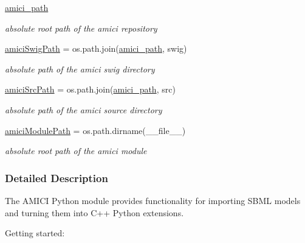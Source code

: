 \begin{DoxyCompactItemize}
\mbox{\hyperlink{namespaceamici_a6b3f3dfe4601baaa0bf0a02b9a01a896}{amici\+\_\+path}}
\begin{DoxyCompactList}\small\item\em absolute root path of the amici repository \end{DoxyCompactList}\item 
\mbox{\label{namespaceamici_a1e71ffa8e12718e578ac6b974c5a6cd5}} 
\mbox{\hyperlink{namespaceamici_a1e71ffa8e12718e578ac6b974c5a6cd5}{amici\+Swig\+Path}} = os.\+path.\+join(\mbox{\hyperlink{namespaceamici_a6b3f3dfe4601baaa0bf0a02b9a01a896}{amici\+\_\+path}}, \textquotesingle{}swig\textquotesingle{})
\begin{DoxyCompactList}\small\item\em absolute path of the amici swig directory \end{DoxyCompactList}\item 
\mbox{\label{namespaceamici_a2dfea9ae83d246c055e3ee84c9c5e9ac}} 
\mbox{\hyperlink{namespaceamici_a2dfea9ae83d246c055e3ee84c9c5e9ac}{amici\+Src\+Path}} = os.\+path.\+join(\mbox{\hyperlink{namespaceamici_a6b3f3dfe4601baaa0bf0a02b9a01a896}{amici\+\_\+path}}, \textquotesingle{}src\textquotesingle{})
\begin{DoxyCompactList}\small\item\em absolute path of the amici source directory \end{DoxyCompactList}\item 
\mbox{\label{namespaceamici_a54d4969414b0861bd938470a7c7bbd20}} 
\mbox{\hyperlink{namespaceamici_a54d4969414b0861bd938470a7c7bbd20}{amici\+Module\+Path}} = os.\+path.\+dirname(\+\_\+\+\_\+file\+\_\+\+\_\+)
\begin{DoxyCompactList}\small\item\em absolute root path of the amici module \end{DoxyCompactList}\end{DoxyCompactItemize}


\subsubsection{Detailed Description}
The A\+M\+I\+CI Python module provides functionality for importing S\+B\+ML models and turning them into C++ Python extensions.

Getting started\+: 
\begin{DoxyCode}{0}
\DoxyCodeLine{}
\end{DoxyCode}
 

